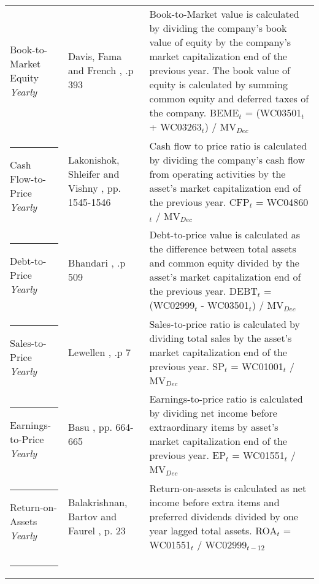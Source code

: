 \documentclass[12pt]{article}
\begin{document}
\begin{appendices}
{{\begin{xltabular}{\textwidth}{ >{\raggedright\arraybackslash}p{0.23\textwidth} >{\raggedright\arraybackslash}p{0.2\textwidth} X}
Book-to-Market Equity \newline \emph{Yearly} 	& Davis, Fama and French \citeyearpar{Davis2000}, .p 393	&  Book-to-Market value is calculated by dividing the company's book value of equity by the company's market capitalization end of the previous year. The book value of equity is calculated by summing common equity and deferred taxes of the company. \newline BEME$_t$ = (WC03501$_{t}$ + WC03263$_{t}$) /  MV$_{Dec}$\\ \rule{-1ex}{3ex}
Cash Flow-to-Price \newline \emph{Yearly}	& Lakonishok, Shleifer and Vishny  \citeyearpar{Lakonishok1994}, pp. 1545-1546 & Cash flow to price ratio is calculated by dividing the company's cash flow from operating activities by the asset's market capitalization end of the previous year. \newline CFP$_t$ = WC04860$_{t}$ / MV$_{Dec}$\\ \rule{-1ex}{3ex}
Debt-to-Price \newline \emph{Yearly}			& Bhandari \citeyearpar{Bhandari1988}, .p 509				& Debt-to-price value is calculated as the difference between total assets and common equity divided by the asset's market capitalization end of the previous year. \newline DEBT$_t$ = (WC02999$_{t}$ - WC03501$_{t}$) / MV$_{Dec}$\\ \rule{-1ex}{3ex}
Sales-to-Price 	\newline \emph{Yearly}		& Lewellen \citeyearpar{Lewellen2015}, .p 7				& Sales-to-price ratio is calculated by dividing total sales by the asset's market capitalization end of the previous year. \newline SP$_t$ = WC01001$_{t}$ / MV$_{Dec}$ \\ \rule{-1ex}{3ex}
Earnings-to-Price \newline \emph{Yearly}		& Basu \citeyearpar{Basu1977}	, pp. 664-665				& Earnings-to-price ratio is calculated by dividing net income before extraordinary items by asset's market capitalization end of the previous year. \newline EP$_t$ = WC01551$_{t}$ / MV$_{Dec}$ \\ \rule{-1ex}{3ex}
Return-on-Assets \newline \emph{Yearly}		& Balakrishnan, Bartov and Faurel \citeyearpar{BALAKRISHNAN2010}, p. 23	& Return-on-assets is calculated as net income before extra items and preferred dividends divided by one year lagged total assets. \newline ROA$_t$ = WC01551$_{t}$ / WC02999$_{t-12}$ \\ \rule{-1ex}{3ex}

\end{xltabular}}}
\end{appendices}
\end{document}
